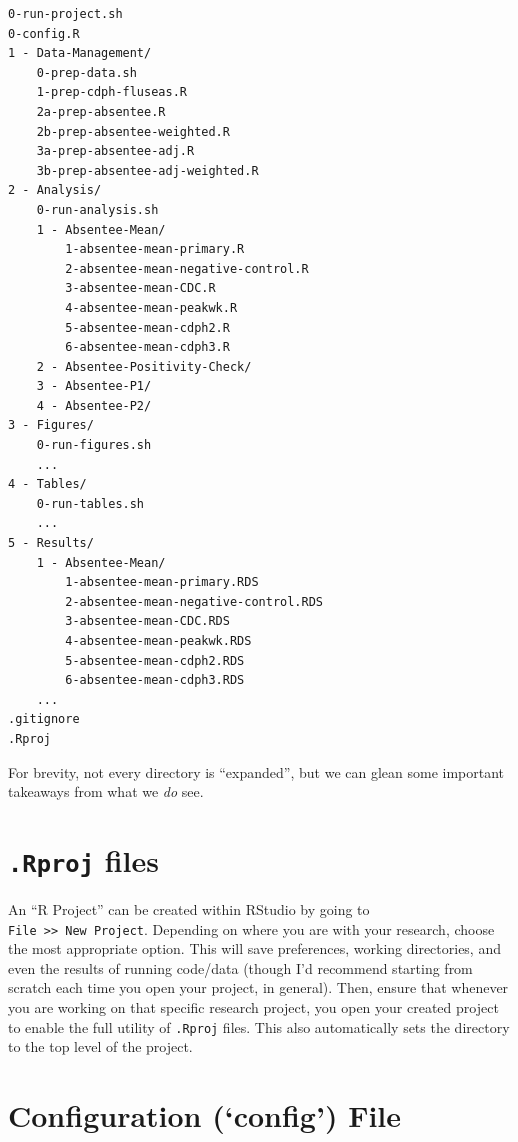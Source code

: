 \documentclass[
]{book}
\begin{document}
\begin{verbatim}
0-run-project.sh
0-config.R
1 - Data-Management/
    0-prep-data.sh
    1-prep-cdph-fluseas.R
    2a-prep-absentee.R
    2b-prep-absentee-weighted.R
    3a-prep-absentee-adj.R
    3b-prep-absentee-adj-weighted.R
2 - Analysis/
    0-run-analysis.sh
    1 - Absentee-Mean/
        1-absentee-mean-primary.R
        2-absentee-mean-negative-control.R
        3-absentee-mean-CDC.R
        4-absentee-mean-peakwk.R
        5-absentee-mean-cdph2.R
        6-absentee-mean-cdph3.R
    2 - Absentee-Positivity-Check/
    3 - Absentee-P1/
    4 - Absentee-P2/
3 - Figures/
    0-run-figures.sh
    ...
4 - Tables/
    0-run-tables.sh
    ...
5 - Results/
    1 - Absentee-Mean/
        1-absentee-mean-primary.RDS
        2-absentee-mean-negative-control.RDS
        3-absentee-mean-CDC.RDS
        4-absentee-mean-peakwk.RDS
        5-absentee-mean-cdph2.RDS
        6-absentee-mean-cdph3.RDS
    ...
.gitignore
.Rproj
\end{verbatim}

For brevity, not every directory is ``expanded'', but we can glean some important takeaways from what we \emph{do} see.

\hypertarget{rproj-files}{%
\section{\texorpdfstring{\texttt{.Rproj} files}{.Rproj files}}\label{rproj-files}}

An ``R Project'' can be created within RStudio by going to \texttt{File\ \textgreater{}\textgreater{}\ New\ Project}. Depending on where you are with your research, choose the most appropriate option. This will save preferences, working directories, and even the results of running code/data (though I'd recommend starting from scratch each time you open your project, in general). Then, ensure that whenever you are working on that specific research project, you open your created project to enable the full utility of \texttt{.Rproj} files. This also automatically sets the directory to the top level of the project.

\hypertarget{configuration-config-file}{%
\section{Configuration (`config') File}\label{configuration-config-file}}
\end{document}
